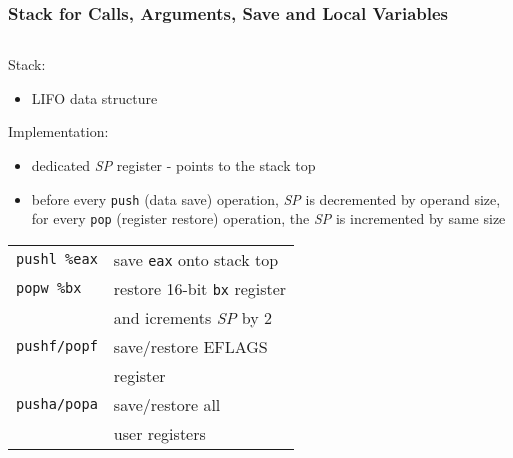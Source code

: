 \documentclass{beamer}
\begin{document}
\begin{frame}
\frametitle{Stack for Calls, Arguments, Save and Local Variables}

\begin{columns}
\begin{column}{0.45\textwidth}
\small
Stack:
\begin{itemize}
\item LIFO data structure
\end{itemize}

Implementation:
\begin{itemize}
\item dedicated \textit{SP} register - points to the stack top
\item before every \texttt{push} (data save) operation, \textit{SP} is decremented by operand size, for every \texttt{pop} (register restore) operation, the \textit{SP} is incremented by same size
\end{itemize}
\begin{tabular}{ l l}
\texttt{pushl \%eax} &  save \texttt{eax} onto stack top\\
\texttt{popw \%bx}   &  restore 16-bit \texttt{bx} register \\
                     &  and icrements \textit{SP} by 2\\
\texttt{pushf/popf}  &  save/restore EFLAGS\\
                     &  register \\
\texttt{pusha/popa}  &  save/restore all\\
                     &  user registers\\
\end{tabular}
\end{column}


\end{columns}
\end{frame}
\end{document}
